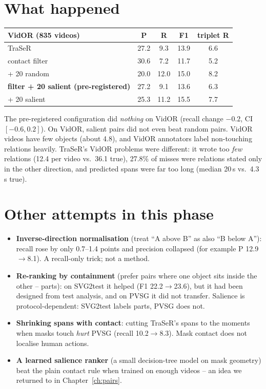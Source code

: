 \documentclass[11pt,openany]{book}
\newcommand{\hsec}{\section*{What happened}}
\begin{document}
\hsec
\begin{center}
\begin{tabular}{@{}lcccc@{}}
\toprule
VidOR (835 videos) & P & R & F1 & triplet R \\
\midrule
TraSeR & 27.2 & 9.3 & 13.9 & 6.6 \\
contact filter & 30.6 & 7.2 & 11.7 & 5.2 \\
+ 20 random & 20.0 & 12.0 & 15.0 & 8.2 \\
\textbf{filter + 20 salient (pre-registered)} & 27.2 & 9.1 & 13.6 & 6.3 \\
+ 20 salient & 25.3 & 11.2 & 15.5 & 7.7 \\
\bottomrule
\end{tabular}
\end{center}
The pre-registered configuration did \emph{nothing} on VidOR (recall change $-0.2$, CI $[-0.6, 0.2]$). On VidOR, salient pairs did
not even beat random pairs. VidOR videos have few objects (about 4.8), and VidOR annotators label non-touching relations heavily.
TraSeR's VidOR problems were different: it wrote too \emph{few} relations (12.4 per video vs.\ 36.1 true), 27.8\% of misses were
relations stated only in the other direction, and predicted spans were far too long (median 20\,s vs.\ 4.3\,s true).

\section{Other attempts in this phase}
\begin{itemize}
  \item \textbf{Inverse-direction normalisation} (treat ``A above B'' as also ``B below A''): recall rose by only 0.7--1.4 points
  and precision collapsed (for example P 12.9$\to$8.1). A recall-only trick; not a method.
  \item \textbf{Re-ranking by containment} (prefer pairs where one object sits inside the other -- parts): on SVG2test it helped
  (F1 22.2$\to$23.6), but it had been designed from test analysis, and on PVSG it did not transfer. Salience is protocol-dependent:
  SVG2test labels parts, PVSG does not.
  \item \textbf{Shrinking spans with contact}: cutting TraSeR's spans to the moments when masks touch \emph{hurt} PVSG (recall
  10.2$\to$8.3). Mask contact does not localise human actions.
  \item \textbf{A learned salience ranker} (a small decision-tree model on mask geometry) beat the plain contact rule when trained on
  enough videos -- an idea we returned to in Chapter~\ref{ch:pairs}.
\end{itemize}
\end{document}
